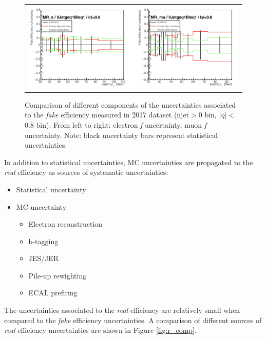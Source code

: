 \begin{figure}[tbh!]
 \begin{center}
 \begin{tabular}{c}
 \includegraphics[width=0.99\textwidth]{figures/Part3/Systematics/MR2}
 \end{tabular}
 \caption{Comparison of different components of the uncertainties associated to the \emph{fake} efficiency measured in 2017 dataset (njet$>$0 bin, $|\eta|<$0.8 bin). From left to right: electron \emph{f} uncertainty, muon \emph{f} uncertainty. Note: black uncertainty bars represent statistical uncertainties.}
 \label{fig:f_comp2}
 \end{center}
\end{figure}

In addition to statistical uncertainties, MC uncertainties are propagated to the \emph{real} efficiency as sources of systematic uncertainties:

\begin{itemize}
\item Statistical uncertainty 
\item MC uncertainty 
\begin{itemize}
\item Electron reconstruction 
\item b-tagging 
\item JES/JER
\item Pile-up rewighting 
\item ECAL prefiring 
\end{itemize}
\end{itemize}

The uncertainties associated to the \emph{real} efficiency are relatively small when compared to the \emph{fake} efficiency uncertainties. A comparison of different sources of \emph{real} efficiency uncertainties are shown in Figure \ref{fig:r_comp}.

